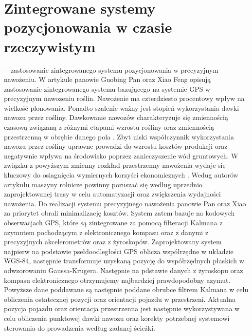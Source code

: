 \section{Zintegrowane systemy pozycjonowania w czasie rzeczywistym}
---zastosowanie zintegrowanego systemu pozycjonowania w precyzyjnym nawożeniu.
W artykule \cite{CCTA5_188_192} panowie Guobing Pan oraz Xiao Feng opisują zastosowanie zintegrowanego systemu bazującego na  systemie GPS w precyzyjnym nawozeniu roślin.
Nawożenie ma czterdziesto procentowy wpływ na wielkość plonowania. Ponadto szalenie ważny jest stopień wykorzystania dawki nawozu przez rośliny.
Dawkowanie nawozów charakteryzuje się zmiennością czasową związaną z różnymi etapami wzrostu rośliny oraz zmiennością przestrzenną w obrębie danego pola \cite{CCTA5_188_192}.
Zbyt niski współczynnik wykorzystania nawozu przez rośliny uprawne prowadzi do wzrostu kosztów produkcji 
oraz negatywnie wpływa na środowisko poprzez zanieczyszenie wód gruntowych.
W związku z powyższym  zmienny rozkład przestrzenny nawożenia wydaje się kluczowy do osiagnięcia wymiernych korzyści ekonomicznych \cite{CCTA5_188_192}.
Wedug autorów artykułu maszyny rolnicze powinny poruszać się według uprzednio zaprojektowanej trasy w celu automatyzacji oraz zwiększenia wydajności nawożenia.
Do realizacji systemu precyzyjnego nawożenia panowie Pan oraz Xiao za priorytet obrali minimalizację kosztów.
System zatem bazuje na kodowych obserwacjach GPS, które są zintegrowane za pomocą filteracji Kalmana
z azymutem pochodzącym z elektronicznego kompasu oraz z danymi z precyzyjnych akcelerometrów oraz z żyroskopów.
Zaprojektowany system najpierw na podstawie psełdoodległości GPS oblicza współrzędne w układzie WGS-84,
następnie transformuje uzyskaną pozycję do współrzędnych płaskich w odwzorowaniu Gaussa-Krugera.
Następnie na pdstawie danych z żyroskopu oraz kompasu elektronicznego otrzymujemy najbardziej prawdopodobny azymut.
Powyższe dane poddawane są następnie poddane obrubce filtrem Kalmana w celu obliczenia ostatecznej pozycji oraz orientacji pojazdu w przestrzeni.
Aktualna pozycja pojazdu oraz orientacja przestrzenna jest następnie wykorzystywana w celu obliczenia punktowej dawki nawozu
oraz korekty potrzebnej systemowi sterowania do prowadzenia według zadanej ścieżki.

